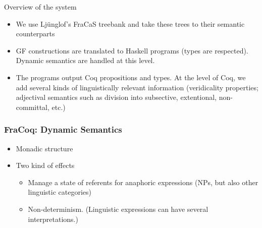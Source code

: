 \documentclass[11pt]{beamer}
\begin{document}
\begin{frame}{Overview of the system}
{
}
  \begin{itemize}
  \item We use Lj\"unglof's FraCaS treebank and take these trees to
    their semantic counterparts
  \item GF constructions are translated to Haskell programs (types are
    respected). Dynamic semantics are handled at this level.
  \item The programs output Coq propositions and types. At the level
    of Coq, we add several kinds of linguistically relevant
    information (veridicality properties; adjectival semantics such as
    division into subsective, extentional, non-committal, etc.)
  \end{itemize}
\end{frame}


\begin{frame}
  \frametitle{FraCoq: Dynamic Semantics}
  \begin{itemize}
  \item Monadic structure \cite{Shan:2002}
  \item Two kind of effects
    \begin{itemize}
    \item Manage a state of referents for anaphoric expressions (NPs,
      but also other linguistic categories)
    \item Non-determinism. (Linguistic expressions can have several
      interpretations.)
    \end{itemize}
  \end{itemize}
\end{frame}
\end{document}

